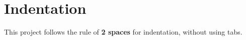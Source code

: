 \section{Indentation}
This project follows the rule of \textbf{2 spaces} for indentation, without using tabs.

